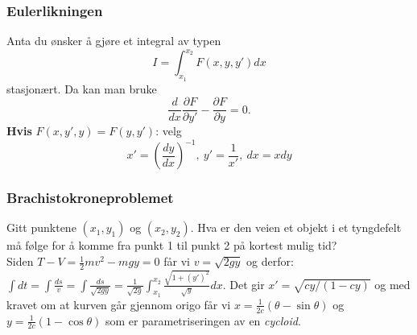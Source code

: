 \documentclass[a4paper, norsk, 8pt]{article}
\newcommand{\PAR}[2]{ \frac{\partial #1}{\partial #2}}
\newcommand{\DIFF}[2]{ \frac{d#1}{d#2} }
\begin{document}
\begin{multicols*}{2}
\subsubsection*{\small Eulerlikningen}
Anta du ønsker å gjøre et integral av typen
\[
I=\int_{x_1}^{x_2}F(x,y,y')dx
\]
stasjonært. Da kan man bruke
\[
\DIFF{}{x}\PAR{F}{y'}-\PAR{F}{y}=0.
\]
\textbf{Hvis} $F(x,y',y)=F(y,y')$: velg\\
\[x'=\left(\DIFF{y}{x}\right)^{-1}, \ y'=\frac{1}{x'}, \ dx= x dy \]

\subsubsection*{\small Brachistokroneproblemet}
Gitt punktene $(x_1,y_1)$ og $(x_2,y_2)$. Hva er den veien et objekt i et tyngdefelt må følge for å komme fra punkt 1 til punkt 2 på kortest mulig tid? \\
Siden $T-V=\frac{1}{2}mv^2-mgy=0$ får vi $v=\sqrt{2gy}$ og derfor:\\
$\int dt = \int \frac{ds}{v} = \int \frac{ds}{\sqrt{2gy}}=\frac{1}{\sqrt{2g}}\int_{x_1}^{x_2} \frac{\sqrt{1+(y')^2}}{\sqrt{y}}dx$. Det gir $x'=\sqrt{cy/(1-cy)}$ og med kravet om at kurven går gjennom origo får vi $x=\frac{1}{2c}(\theta-\sin \theta)$ og $y=\frac{1}{2c}(1-\cos \theta)$ som er parametriseringen av en \textit{cycloid}.



\end{multicols*}
\end{document}
